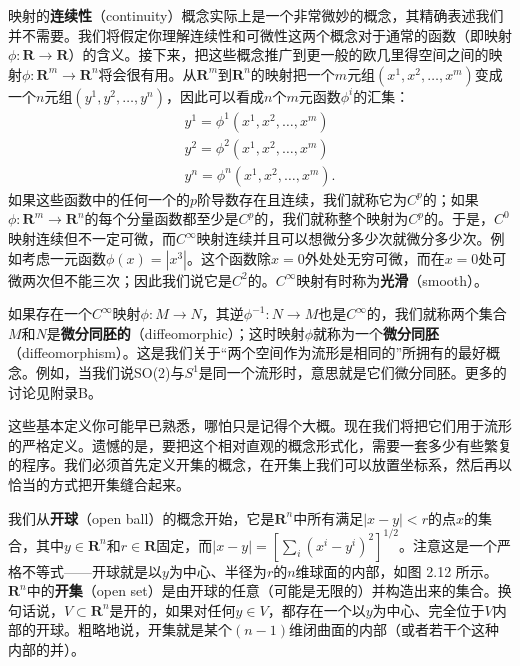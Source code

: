 映射的\textbf{连续性}（continuity）概念实际上是一个非常微妙的概念，其精确表述我们并不需要。我们将假定你理解连续性和可微性这两个概念对于通常的函数（即映射$\phi:\mathbf{R}\to\mathbf{R}$）的含义。接下来，把这些概念推广到更一般的欧几里得空间之间的映射$\phi:\mathbf{R}^m\to\mathbf{R}^n$将会很有用。从$\mathbf{R}^m$到$\mathbf{R}^n$的映射把一个$m$元组$(x^1,x^2,\ldots,x^m)$变成一个$n$元组$(y^1,y^2,\ldots,y^n)$，因此可以看成$n$个$m$元函数$\phi^i$的汇集：
\begin{equation*}
\begin{gathered}
y^1 = \phi^1(x^1, x^2, \ldots, x^m)\\
y^2 = \phi^2(x^1, x^2, \ldots, x^m)\\
y^n = \phi^n(x^1, x^2, \ldots, x^m).
\end{gathered}
\tag{2.8}
\end{equation*}
如果这些函数中的任何一个的$p$阶导数存在且连续，我们就称它为$C^p$的；如果$\phi:\mathbf{R}^m\to\mathbf{R}^n$的每个分量函数都至少是$C^p$的，我们就称整个映射为$C^p$的。于是，$C^0$映射连续但不一定可微，而$C^\infty$映射连续并且可以想微分多少次就微分多少次。例如考虑一元函数$\phi(x)=|x^3|$。这个函数除$x=0$外处处无穷可微，而在$x=0$处可微两次但不能三次；因此我们说它是$C^2$的。$C^\infty$映射有时称为\textbf{光滑}（smooth）。

如果存在一个$C^\infty$映射$\phi:M\to N$，其逆$\phi^{-1}:N\to M$也是$C^\infty$的，我们就称两个集合$M$和$N$是\textbf{微分同胚的}（diffeomorphic）；这时映射$\phi$就称为一个\textbf{微分同胚}（diffeomorphism）。这是我们关于“两个空间作为流形是相同的”所拥有的最好概念。例如，当我们说SO(2)与$S^1$是同一个流形时，意思就是它们微分同胚。更多的讨论见附录B。

这些基本定义你可能早已熟悉，哪怕只是记得个大概。现在我们将把它们用于流形的严格定义。遗憾的是，要把这个相对直观的概念形式化，需要一套多少有些繁复的程序。我们必须首先定义开集的概念，在开集上我们可以放置坐标系，然后再以恰当的方式把开集缝合起来。

我们从\textbf{开球}（open ball）的概念开始，它是$\mathbf{R}^n$中所有满足$|x-y|<r$的点$x$的集合，其中$y\in\mathbf{R}^n$和$r\in\mathbf{R}$固定，而$|x-y|=\left[\sum_i(x^i-y^i)^2\right]^{1/2}$。注意这是一个严格不等式——开球就是以$y$为中心、半径为$r$的$n$维球面的内部，如图 2.12 所示。$\mathbf{R}^n$中的\textbf{开集}（open set）是由开球的任意（可能是无限的）并构造出来的集合。换句话说，$V\subset\mathbf{R}^n$是开的，如果对任何$y\in V$，都存在一个以$y$为中心、完全位于$V$内部的开球。粗略地说，开集就是某个$(n-1)$维闭曲面的内部（或者若干个这种内部的并）。


